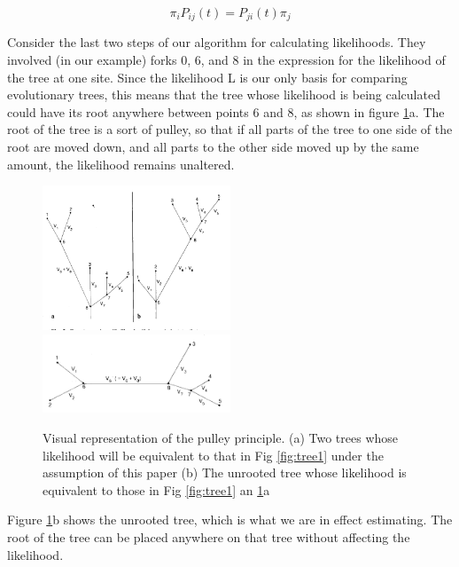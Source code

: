 \begin{equation}
\pi_i P_{ij}(t) = P_{ji}(t) \pi_j
\end{equation}

Consider the last two steps of our algorithm for calculating likelihoods. 
They involved (in our example) forks 0, 6, and 8 in the expression for the likelihood of the tree at one site.
Since the likelihood L is our only basis for comparing evolutionary trees, this means that the tree whose likelihood is being calculated could have its root anywhere between points 6 and 8, as shown in figure \ref{fig:pulley}a. The root of the tree is a sort of pulley, so that if all parts of the tree to one side of the root are moved down, and all parts to the other side moved up by the same amount, the likelihood remains unaltered.


\begin{figure}[H]
		\centering
		\includegraphics[width=0.5\textwidth]{tree2.png}
		\includegraphics[width=0.5\textwidth]{tree3.png}
		\caption{Visual representation of the pulley principle. (a) Two trees whose likelihood will be equivalent to that in Fig \ref{fig:tree1} under the assumption of this paper (b) The unrooted tree whose likelihood is equivalent to those in Fig \ref{fig:tree1} an \ref{fig:pulley}a }
		\label{fig:pulley}
	\end{figure}


Figure \ref{fig:pulley}b shows the unrooted tree, which is what we are in effect estimating.
The root of the tree can be placed anywhere on that tree without affecting the likelihood.

